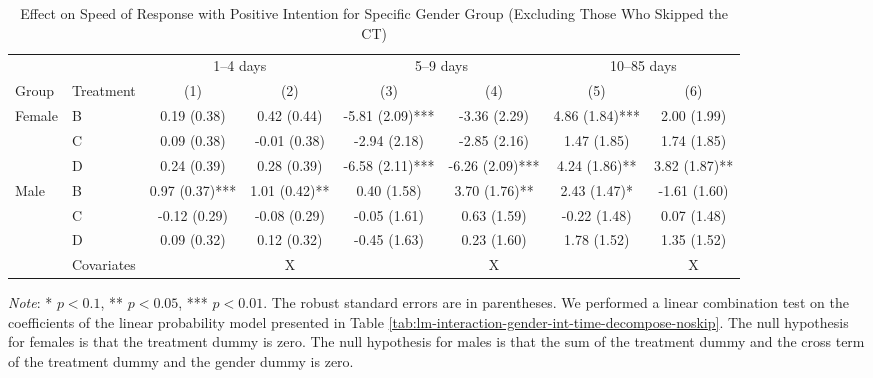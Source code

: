 \documentclass[12pt, a4paper]{article}
\begin{document}
\begin{table}[H]

\caption{\label{tab:lh-interaction-gender-int-time-decompose-noskip}Effect on Speed of Response with Positive Intention for Specific Gender Group (Excluding Those Who Skipped the CT)}
\centering
\fontsize{8}{10}\selectfont
\begin{threeparttable}
\begin{tabular}[t]{llcccccc}
\toprule
\multicolumn{2}{c}{ } & \multicolumn{2}{c}{1--4 days} & \multicolumn{2}{c}{5--9 days} & \multicolumn{2}{c}{10--85 days} \\
\cmidrule(l{3pt}r{3pt}){3-4} \cmidrule(l{3pt}r{3pt}){5-6} \cmidrule(l{3pt}r{3pt}){7-8}
Group & Treatment & (1) & (2) & (3) & (4) & (5) & (6)\\
\midrule
Female & B & 0.19 (0.38) & 0.42 (0.44) & -5.81 (2.09)*** & -3.36 (2.29) & 4.86 (1.84)*** & 2.00 (1.99)\\
 & C & 0.09 (0.38) & -0.01 (0.38) & -2.94 (2.18) & -2.85 (2.16) & 1.47 (1.85) & 1.74 (1.85)\\
 & D & 0.24 (0.39) & 0.28 (0.39) & -6.58 (2.11)*** & -6.26 (2.09)*** & 4.24 (1.86)** & 3.82 (1.87)**\\
Male & B & 0.97 (0.37)*** & 1.01 (0.42)** & 0.40 (1.58) & 3.70 (1.76)** & 2.43 (1.47)* & -1.61 (1.60)\\
 & C & -0.12 (0.29) & -0.08 (0.29) & -0.05 (1.61) & 0.63 (1.59) & -0.22 (1.48) & 0.07 (1.48)\\
 & D & 0.09 (0.32) & 0.12 (0.32) & -0.45 (1.63) & 0.23 (1.60) & 1.78 (1.52) & 1.35 (1.52)\\
\midrule
 & Covariates &  & X &  & X &  & X\\
\bottomrule
\end{tabular}
\begin{tablenotes}
\item \emph{Note}: * $p < 0.1$, ** $p < 0.05$, *** $p < 0.01$. The robust standard errors are in parentheses. We performed a linear combination test on the coefficients of the linear probability model presented in Table \ref{tab:lm-interaction-gender-int-time-decompose-noskip}. The null hypothesis for females is that the treatment dummy is zero. The null hypothesis for males is that the sum of the treatment dummy and the cross term of the treatment dummy and the gender dummy is zero.
\end{tablenotes}
\end{threeparttable}
\end{table}
\end{document}
